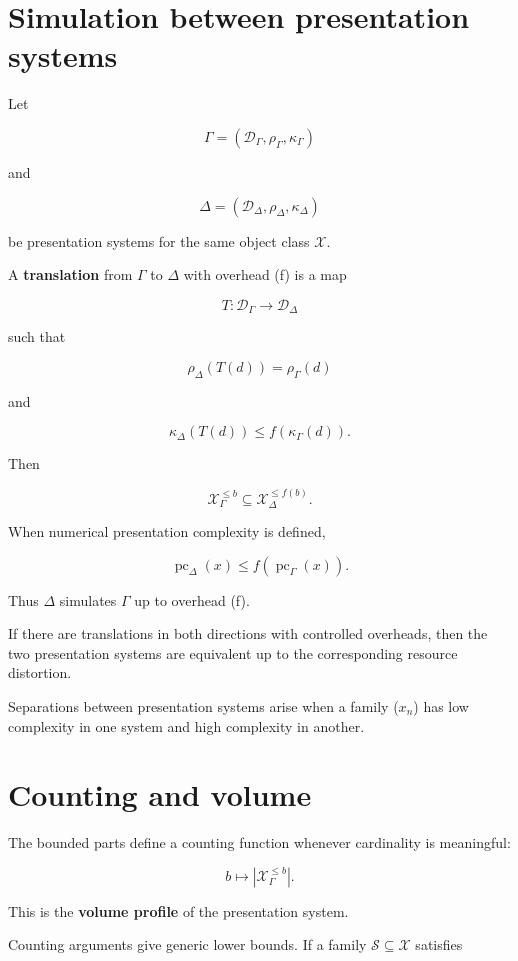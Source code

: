 \documentclass[11pt]{article}
\begin{document}
\section{Simulation between presentation systems}

Let

\[
\Gamma=(\mathcal D_\Gamma,\rho_\Gamma,\kappa_\Gamma)
\]

and

\[
\Delta=(\mathcal D_\Delta,\rho_\Delta,\kappa_\Delta)
\]

be presentation systems for the same object class \(\mathcal X\).

A \textbf{translation} from \(\Gamma\) to \(\Delta\) with overhead (f) is a map

\[
T:\mathcal D_\Gamma\to\mathcal D_\Delta
\]

such that

\[
\rho_\Delta(T(d))=\rho_\Gamma(d)
\]

and

\[
\kappa_\Delta(T(d))\leq f(\kappa_\Gamma(d)).
\]

Then

\[
\mathcal X_\Gamma^{\leq b}
\subseteq
\mathcal X_\Delta^{\leq f(b)}.
\]

When numerical presentation complexity is defined,

\[
\operatorname{pc}_\Delta(x)
\leq
f(\operatorname{pc}_\Gamma(x)).
\]

Thus \(\Delta\) simulates \(\Gamma\) up to overhead (f).

If there are translations in both directions with controlled overheads, then the two presentation systems are equivalent up to the corresponding resource distortion.

Separations between presentation systems arise when a family (\(x_n\)) has low complexity in one system and high complexity in another.


\section{Counting and volume}

The bounded parts define a counting function whenever cardinality is meaningful:

\[
b\mapsto |\mathcal X_\Gamma^{\leq b}|.
\]

This is the \textbf{volume profile} of the presentation system.

Counting arguments give generic lower bounds. If a family \(\mathcal S\subseteq\mathcal X\) satisfies
\end{document}
